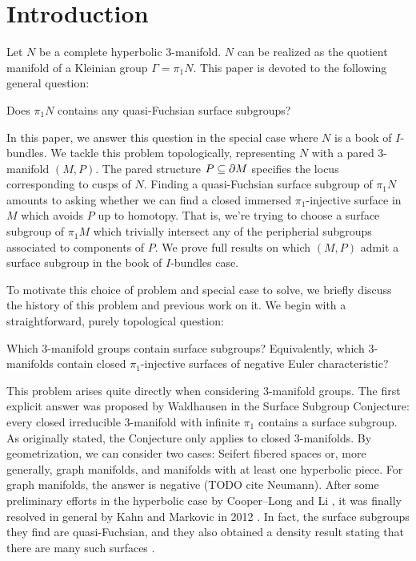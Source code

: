 \section{Introduction}

Let $N$ be a complete hyperbolic 3-manifold. $N$ can be realized as the
quotient manifold of a Kleinian group $\Gamma=\pi_1N$. This paper is devoted to
the following general question:

\begin{prob}

Does $\pi_1N$ contains any quasi-Fuchsian surface subgroups?

\end{prob}

In this paper, we answer this question in the special case where $N$ is a book
of $I$-bundles. We tackle this problem topologically, representing $N$ with
a pared 3-manifold $(M,P)$.  The pared structure $P\subseteq\partial M$ specifies the
locus corresponding to cusps of $N$. Finding a quasi-Fuchsian surface subgroup
of $\pi_1N$ amounts to asking whether we can find a closed immersed
$\pi_1$-injective surface in $M$ which avoids $P$ up to homotopy.  That is,
we're trying to choose a surface subgroup of $\pi_1M$ which trivially intersect
any of the peripherial subgroups associated to components of $P$. We prove full
results on which $(M,P)$ admit a surface subgroup in the book of $I$-bundles
case.

To motivate this choice of problem and special case to solve, we briefly
discuss the history of this problem and previous work on it. We begin with
a straightforward, purely topological question:

\begin{prob}

Which 3-manifold groups contain surface subgroups? Equivalently, which
3-manifolds contain closed $\pi_1$-injective surfaces of negative Euler
characteristic?

\end{prob}

This problem arises quite directly when considering 3-manifold groups. The
first explicit answer was proposed by Waldhausen \cite{Kirby} in
the Surface Subgroup Conjecture: every closed irreducible 3-manifold with
infinite $\pi_1$ contains a surface subgroup. As originally stated, the
Conjecture only applies to closed 3-manifolds. By geometrization, we can
consider two cases: Seifert fibered spaces or, more generally, graph manifolds,
and manifolds with at least one hyperbolic piece. For graph manifolds, the
answer is negative (TODO cite Neumann).  After some preliminary efforts in the
hyperbolic case by Cooper--Long \cite{CooperLong} and Li \cite{Li}, it was
finally resolved in general by Kahn and Markovic in
2012 \cite{KM}.  In fact, the surface subgroups they find are quasi-Fuchsian,
and they also obtained a density result stating that there are many such
surfaces \cite{KM2}.

